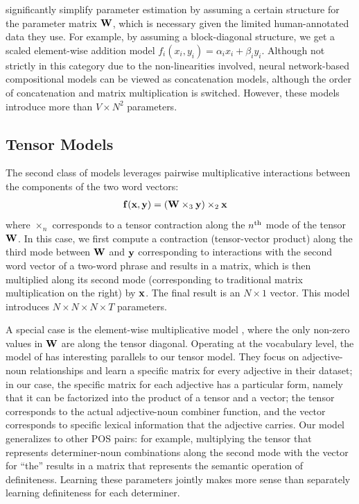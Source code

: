 \documentclass[11pt,letterpaper]{article}
\newcommand{\bX}{{\bf x}}
\newcommand{\bY}{{\bf y}}
\newcommand{\bF}{{\bf f}}
\newcommand{\bW}{{\bf W}}
\begin{document}
 significantly simplify parameter estimation by assuming a certain structure for the parameter matrix $\bW$, which is necessary given the limited human-annotated data they use.   
For example, by assuming a block-diagonal structure, we get a scaled element-wise addition model $f_i (x_i, y_i) = \alpha_i x_i + \beta_i y_i$. 
Although not strictly in this category due to the non-linearities involved, neural network-based compositional models \cite{Socher2012,Hermann2013} can be viewed as concatenation models, although the order of concatenation and matrix multiplication is switched. 
However, these models introduce more than $V \times N^2$ parameters. 

\subsection{Tensor Models}
\label{sec:tensor}

The second class of models leverages pairwise multiplicative interactions between the components of the two word vectors:
\begin{align}
	\bF (\bX, \bY) &= (\bW \times_3 \bY) \times_2 \bX
	\label{eq:tensor}
\end{align}
where $\times_n$ corresponds to a tensor contraction along the $n\textsuperscript{th}$ mode of the tensor $\bW$. 
In this case, we first compute a contraction (tensor-vector product) along the third mode between $\bW$ and $\bY$ corresponding to interactions with the second word vector of a two-word phrase and results in a matrix, which is then multiplied along its second mode (corresponding to traditional matrix multiplication on the right) by $\bX$.  
The final result is an $N \times 1$ vector.  
This model introduces $N \times N \times N \times T$ parameters.  

A special case is the element-wise multiplicative model \cite{Mitchell2008}, where the only non-zero values in $\bW$ are along the tensor diagonal.  
Operating at the vocabulary level, the model of  has interesting parallels to our tensor model. 
They focus on adjective-noun relationships and learn a specific matrix for every adjective in their dataset; in our case, the specific matrix for each adjective has a particular form, namely that it can be factorized into the product of a tensor and a vector; the tensor corresponds to the actual adjective-noun combiner function, and the vector corresponds to specific lexical information that the adjective carries. 
Our model generalizes to other POS pairs: for example, multiplying the tensor that represents determiner-noun combinations along the second mode with the vector for ``the'' results in a matrix that represents the semantic operation of definiteness.  
Learning these parameters jointly makes more sense than separately learning definiteness for each determiner.  
\end{document}
